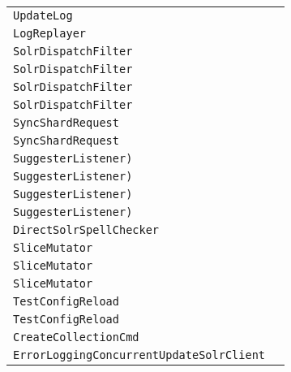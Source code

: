 \begin{center}
\begin{tabular}{ll}
\lstinline/UpdateLog/&\raisebox{0pt}{\lstinline/highestVersion(SolrIndex)/}\\
\lstinline/LogReplayer/&\raisebox{0pt}{\lstinline/run()/}\\
\lstinline/SolrDispatchFilter/&\raisebox{0pt}{\lstinline/authenticateRequest(ServletRequest)/}\\
\lstinline/SolrDispatchFilter/&\raisebox{0pt}{\lstinline/authenticateRequest(ServletRequest)/}\\
\lstinline/SolrDispatchFilter/&\raisebox{0pt}{\lstinline/authenticateRequest(ServletRequest)/}\\
\lstinline/SolrDispatchFilter/&\raisebox{0pt}{\lstinline/authenticateRequest(ServletRequest)/}\\
\lstinline/SyncShardRequest/&\raisebox{0pt}{\lstinline/booleanhandleUpdates(ShardResponsesrsp)/}\\
\lstinline/SyncShardRequest/&\raisebox{0pt}{\lstinline/booleanhandleUpdates(ShardResponsesrsp)/}\\
\lstinline/SuggesterListener)/&\raisebox{0pt}{\lstinline/buildSuggesterIndex(SolrIndexSearch)/}\\
\lstinline/SuggesterListener)/&\raisebox{0pt}{\lstinline/buildSuggesterIndex(SolrIndexSearch)/}\\
\lstinline/SuggesterListener)/&\raisebox{0pt}{\lstinline/buildSuggesterIndex(SolrIndexSearch)/}\\
\lstinline/SuggesterListener)/&\raisebox{0pt}{\lstinline/buildSuggesterIndex(SolrIndexSearch)/}\\
\lstinline/DirectSolrSpellChecker/&\raisebox{0pt}{\lstinline/Stringinit(NamedList)/}\\
\lstinline/SliceMutator/&\raisebox{0pt}{\lstinline/ZkWriteCommandremoveRoutingRule(ClusterState)/}\\
\lstinline/SliceMutator/&\raisebox{0pt}{\lstinline/ZkWriteCommandremoveRoutingRule(ClusterState)/}\\
\lstinline/SliceMutator/&\raisebox{0pt}{\lstinline/ZkWriteCommandremoveRoutingRule(ClusterState)/}\\
\lstinline/TestConfigReload/&\raisebox{0pt}{\lstinline/checkConfReload()/}\\
\lstinline/TestConfigReload/&\raisebox{0pt}{\lstinline/checkConfReload()/}\\
\lstinline/CreateCollectionCmd/&\raisebox{0pt}{\lstinline/StringgetConfigName(String)/}\\
\lstinline/ErrorLoggingConcurrentUpdateSolrClient/&\raisebox{0pt}{\lstinline/handleError(Throwable)/}\\

\end{tabular}
\end{center}
